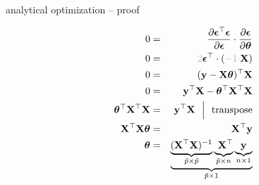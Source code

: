 \documentclass[11pt,compress,t,notes=noshow, xcolor=table]{beamer}
\begin{document}
\begin{vbframe}{analytical optimization -- proof}
\begin{minipage}[t]{0.45\textwidth}
\begin{eqnarray*}
        0 &=& \frac{\partial \bm{\epsilon}^\top \bm{\epsilon}}{\partial 
        \bm{\epsilon}} \cdot \frac{\partial \bm{\epsilon}}{\partial \thetab} \\
        0 &=& \textcolor{black!30}{2}  \bm{\epsilon}^\top \cdot (
        \textcolor{black!30}{-1 \cdot} \Xmat) \\
        0 &=& (\yv - \Xmat \thetab)^\top \Xmat \\
        0 &=& \yv^\top \Xmat - \thetab^\top \Xmat^\top \Xmat \\
        \thetab^\top \Xmat^\top \Xmat &=& \yv^\top \Xmat 
        ~~ \Big \rvert ~~ \text{transpose} \\
        \Xmat^\top \Xmat \thetab &=& \Xmat^\top \yv \\
        \thetab &=& \underbrace{
        \underbrace{(\Xmat^\top \Xmat)^{-1}}_{\tilde p \times \tilde p}
        \underbrace{\phantom{(} \Xmat^\top}_{\tilde p \times n} 
        \underbrace{\yv}_{n \times 1}}_{\tilde p \times 1}
    \end{eqnarray*}
\end{minipage}

\end{vbframe}


\endlecture
\end{document}
